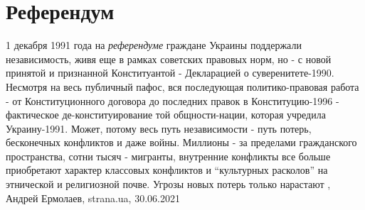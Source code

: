  
 
 
 
 
\chapter{Референдум}
\label{sec:slova.referendum}

1 декабря 1991 года на \emph{референдуме} граждане Украины поддержали независимость,
живя еще в рамках советских правовых норм, но - с новой принятой и признанной
Конституантой - Декларацией о суверенитете-1990.  Несмотря на весь публичный
пафос, вся последующая политико-правовая работа - от Конституционного договора
до последних правок в Конституцию-1996 - фактическое де-конституирование той
общности-нации, которая учредила Украину-1991. Может, потому весь путь
независимости - путь потерь, бесконечных конфликтов и даже войны. Миллионы - за
пределами гражданского пространства, сотни тысяч - мигранты, внутренние
конфликты все больше приобретают характер классовых конфликтов и \enquote{культурных
расколов} на этнической и религиозной почве. Угрозы новых потерь только
нарастают
, 
Андрей Ермолаев, strana.ua, 30.06.2021

